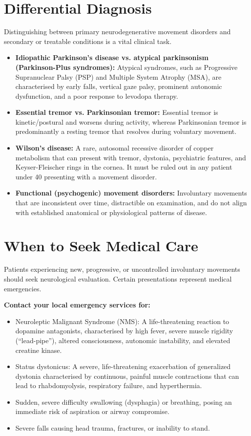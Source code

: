 \section*{Differential Diagnosis}
Distinguishing between primary neurodegenerative movement disorders and secondary or treatable conditions is a vital clinical task.
\begin{itemize}
    \item \textbf{Idiopathic Parkinson's disease vs. atypical parkinsonism (Parkinson-Plus syndromes):} Atypical syndromes, such as Progressive Supranuclear Palsy (PSP) and Multiple System Atrophy (MSA), are characterised by early falls, vertical gaze palsy, prominent autonomic dysfunction, and a poor response to levodopa therapy.
    \item \textbf{Essential tremor vs. Parkinsonian tremor:} Essential tremor is kinetic/postural and worsens during activity, whereas Parkinsonian tremor is predominantly a resting tremor that resolves during voluntary movement.
    \item \textbf{Wilson's disease:} A rare, autosomal recessive disorder of copper metabolism that can present with tremor, dystonia, psychiatric features, and Keyser-Fleischer rings in the cornea. It must be ruled out in any patient under 40 presenting with a movement disorder.
    \item \textbf{Functional (psychogenic) movement disorders:} Involuntary movements that are inconsistent over time, distractible on examination, and do not align with established anatomical or physiological patterns of disease.
\end{itemize}

\section*{When to Seek Medical Care}
Patients experiencing new, progressive, or uncontrolled involuntary movements should seek neurological evaluation. Certain presentations represent medical emergencies.

\textbf{Contact your local emergency services for:}
\begin{itemize}
    \item Neuroleptic Malignant Syndrome (NMS): A life-threatening reaction to dopamine antagonists, characterised by high fever, severe muscle rigidity (``lead-pipe''), altered consciousness, autonomic instability, and elevated creatine kinase.
    \item Status dystonicus: A severe, life-threatening exacerbation of generalized dystonia characterised by continuous, painful muscle contractions that can lead to rhabdomyolysis, respiratory failure, and hyperthermia.
    \item Sudden, severe difficulty swallowing (dysphagia) or breathing, posing an immediate risk of aspiration or airway compromise.
    \item Severe falls causing head trauma, fractures, or inability to stand.
\end{itemize}

